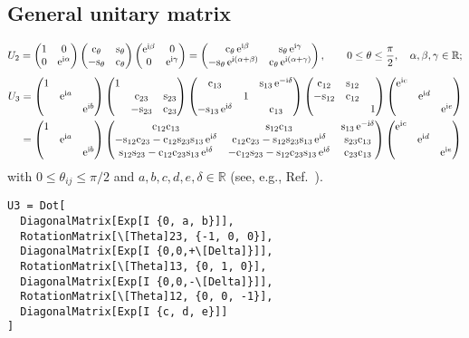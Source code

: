 \documentclass[CheatSheet]{subfiles}
\begin{document}
\subsection{General unitary matrix}
\begin{equation}
 U_2 =
\begin{pmatrix}1&0\\0&\mathop{}\!\mathrm{e}^{\mathrm{i}\alpha}\end{pmatrix}\begin{pmatrix}\mathrm{c}_{\theta}&\mathrm{s}_{\theta}\\-\mathrm{s}_{\theta}&\mathrm{c}_{\theta}\end{pmatrix}\begin{pmatrix}\mathop{}\!\mathrm{e}^{\mathrm{i}\beta}&0\\0&\mathop{}\!\mathrm{e}^{\mathrm{i}\gamma}\end{pmatrix}
=
\begin{pmatrix}\phantom{-}
\mathrm{c}_{\theta}\mathop{}\!\mathrm{e}^{\mathrm{i}\beta} & \mathrm{s}_{\theta}\mathop{}\!\mathrm{e}^{\mathrm{i}\gamma}\\
-\mathrm{s}_{\theta}\mathop{}\!\mathrm{e}^{\mathrm{i}(\alpha+\beta)} & \mathrm{c}_{\theta}\mathop{}\!\mathrm{e}^{\mathrm{i}(\alpha+\gamma)}
\end{pmatrix},\qquad
0\le\theta\le\frac{\pi}2,\quad \alpha,\beta,\gamma\in\mathbb R;
\end{equation}
\begin{align}
 U_3 &=
\pmat{1&&\\&\ee^{\ii a}&\\&&\ee^{\ii b}}
 \pmat{1&&\\&\co{23}&\si{23}\\&-\si{23}&\co{23}}
 \pmat{\co{13}&&\si{13}\ee^{-\ii\delta}\\&1&\\-\si{13}\ee^{\ii\delta}&&\co{13}}
 \pmat{\co{12}&\si{12}&\\-\si{12}&\co{12}&\\&&1}
\pmat{\ee^{\ii c}&&\\&\ee^{\ii d}&\\&&\ee^{\ii e}}
\\&=
\pmat{1&&\\&\ee^{\ii a}&\\&&\ee^{\ii b}}
 \pmat{
 \co{12} \co{13} & \si{12} \co{13} & \si{13} \ee^{-\ii\delta}\\
 -\si{12} \co{23} - \co{12} \si{23} \si{13} \ee^{\ii\delta}& \co{12} \co{23} - \si{12}\si{23}\si{13} \ee^{\ii\delta}& \si{23}\co{13}\\
  \si{12}\si{23} - \co{12} \co{23} \si{13}\ee^{\ii\delta} & -\co{12}\si{23}-\si{12}\co{23}\si{13}\ee^{\ii\delta} & \co{23} \co{13}}
\pmat{\ee^{\ii c}&&\\&\ee^{\ii d}&\\&&\ee^{\ii e}}
\label{eq:GeneralUnitary33}
\end{align}
with $0\le \theta_{ij}\le\pi/2$ and $a,b,c,d,e,\delta\in\mathbb R$ (see, e.g., Ref.~\cite{Rasin:1997pn}).

\begin{verbatim}
U3 = Dot[
  DiagonalMatrix[Exp[I {0, a, b}]],
  RotationMatrix[\[Theta]23, {-1, 0, 0}],
  DiagonalMatrix[Exp[I {0,0,+\[Delta]}]],
  RotationMatrix[\[Theta]13, {0, 1, 0}],
  DiagonalMatrix[Exp[I {0,0,-\[Delta]}]],
  RotationMatrix[\[Theta]12, {0, 0, -1}],
  DiagonalMatrix[Exp[I {c, d, e}]]
]
\end{verbatim}
\end{document}
